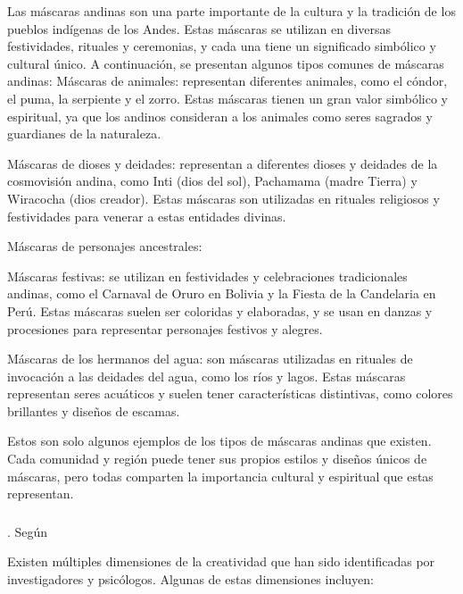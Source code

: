 \documentclass[12pt,a4paper]{article}
\begin{document}
Las máscaras andinas son una parte importante de la cultura y la tradición de los pueblos indígenas de los Andes. Estas máscaras se utilizan en diversas festividades, rituales y ceremonias, y cada una tiene un significado simbólico y cultural único. A continuación, se presentan algunos tipos comunes de máscaras andinas:
	Máscaras de animales: representan diferentes animales, como el cóndor, el puma, la serpiente y el zorro. Estas máscaras tienen un gran valor simbólico y espiritual, ya que los andinos consideran a los animales como seres sagrados y guardianes de la naturaleza.

	Máscaras de dioses y deidades: representan a diferentes dioses y deidades de la cosmovisión andina, como Inti (dios del sol), Pachamama (madre Tierra) y Wiracocha (dios creador). Estas máscaras son utilizadas en rituales religiosos y festividades para venerar a estas entidades divinas.

	Máscaras de personajes ancestrales: %

	Máscaras festivas: se utilizan en festividades y celebraciones tradicionales andinas, como el Carnaval de Oruro en Bolivia y la Fiesta de la Candelaria en Perú. Estas máscaras suelen ser coloridas y elaboradas, y se usan en danzas y procesiones para representar personajes festivos y alegres.

	Máscaras de los hermanos del agua: son máscaras utilizadas en rituales de invocación a las deidades del agua, como los ríos y lagos. Estas máscaras representan seres acuáticos y suelen tener características distintivas, como colores brillantes y diseños de escamas.

	      Estos son solo algunos ejemplos de los tipos de máscaras andinas que existen. Cada comunidad y región puede tener sus propios estilos y diseños únicos de máscaras, pero todas comparten la importancia cultural y espiritual que estas representan.


\subsubsection{\variabled}. Según %

Existen múltiples dimensiones de la creatividad que han sido identificadas por investigadores y psicólogos. Algunas de estas dimensiones incluyen:
\end{document}

